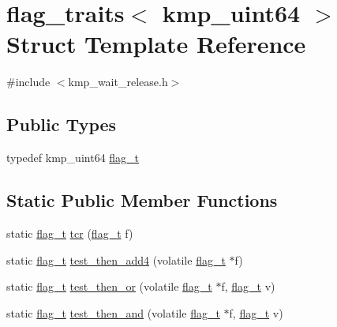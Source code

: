 \hypertarget{structflag__traits_3_01kmp__uint64_01_4}{\section{flag\-\_\-traits$<$ kmp\-\_\-uint64 $>$ Struct Template Reference}
\label{structflag__traits_3_01kmp__uint64_01_4}
}


{\ttfamily \#include $<$kmp\-\_\-wait\-\_\-release.\-h$>$}

\subsection*{Public Types}
\begin{DoxyCompactItemize}
\item 
typedef kmp\-\_\-uint64 \hyperlink{structflag__traits_3_01kmp__uint64_01_4_a1cd5c1b0bf5f69b71ca924315e7320c2}{flag\-\_\-t}
\end{DoxyCompactItemize}
\subsection*{Static Public Member Functions}
\begin{DoxyCompactItemize}
\item 
static \hyperlink{structflag__traits_3_01kmp__uint64_01_4_a1cd5c1b0bf5f69b71ca924315e7320c2}{flag\-\_\-t} \hyperlink{structflag__traits_3_01kmp__uint64_01_4_ac3dc6ed6d8b3f856fcf65f779e0c3bd2}{tcr} (\hyperlink{structflag__traits_3_01kmp__uint64_01_4_a1cd5c1b0bf5f69b71ca924315e7320c2}{flag\-\_\-t} f)
\item 
static \hyperlink{structflag__traits_3_01kmp__uint64_01_4_a1cd5c1b0bf5f69b71ca924315e7320c2}{flag\-\_\-t} \hyperlink{structflag__traits_3_01kmp__uint64_01_4_adf609d7418984d73b263790475250758}{test\-\_\-then\-\_\-add4} (volatile \hyperlink{structflag__traits_3_01kmp__uint64_01_4_a1cd5c1b0bf5f69b71ca924315e7320c2}{flag\-\_\-t} $\ast$f)
\item 
static \hyperlink{structflag__traits_3_01kmp__uint64_01_4_a1cd5c1b0bf5f69b71ca924315e7320c2}{flag\-\_\-t} \hyperlink{structflag__traits_3_01kmp__uint64_01_4_a579a1207cff793eace2c893d194cc575}{test\-\_\-then\-\_\-or} (volatile \hyperlink{structflag__traits_3_01kmp__uint64_01_4_a1cd5c1b0bf5f69b71ca924315e7320c2}{flag\-\_\-t} $\ast$f, \hyperlink{structflag__traits_3_01kmp__uint64_01_4_a1cd5c1b0bf5f69b71ca924315e7320c2}{flag\-\_\-t} v)
\item 
static \hyperlink{structflag__traits_3_01kmp__uint64_01_4_a1cd5c1b0bf5f69b71ca924315e7320c2}{flag\-\_\-t} \hyperlink{structflag__traits_3_01kmp__uint64_01_4_ad8b374576e9d570db9be0aaab8961792}{test\-\_\-then\-\_\-and} (volatile \hyperlink{structflag__traits_3_01kmp__uint64_01_4_a1cd5c1b0bf5f69b71ca924315e7320c2}{flag\-\_\-t} $\ast$f, \hyperlink{structflag__traits_3_01kmp__uint64_01_4_a1cd5c1b0bf5f69b71ca924315e7320c2}{flag\-\_\-t} v)
\end{DoxyCompactItemize}
